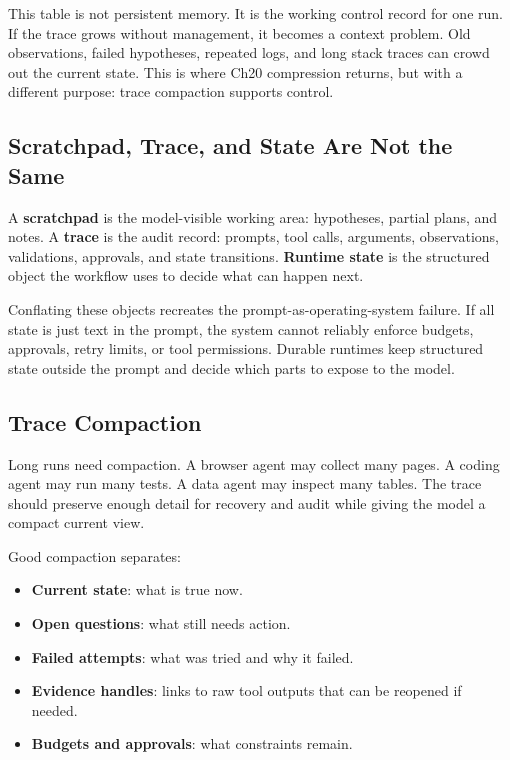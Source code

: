 This table is not persistent memory. It is the working control record for one run. If the trace grows without management, it becomes a context problem. Old observations, failed hypotheses, repeated logs, and long stack traces can crowd out the current state. This is where Ch20 compression returns, but with a different purpose: trace compaction supports control.

\subsection{Scratchpad, Trace, and State Are Not the Same}

A \textbf{scratchpad} is the model-visible working area: hypotheses, partial plans, and notes. A \textbf{trace} is the audit record: prompts, tool calls, arguments, observations, validations, approvals, and state transitions. \textbf{Runtime state} is the structured object the workflow uses to decide what can happen next.

Conflating these objects recreates the prompt-as-operating-system failure. If all state is just text in the prompt, the system cannot reliably enforce budgets, approvals, retry limits, or tool permissions. Durable runtimes keep structured state outside the prompt and decide which parts to expose to the model.

\subsection{Trace Compaction}

Long runs need compaction. A browser agent may collect many pages. A coding agent may run many tests. A data agent may inspect many tables. The trace should preserve enough detail for recovery and audit while giving the model a compact current view.

Good compaction separates:

\begin{itemize}[nosep]
  \item \textbf{Current state}: what is true now.
  \item \textbf{Open questions}: what still needs action.
  \item \textbf{Failed attempts}: what was tried and why it failed.
  \item \textbf{Evidence handles}: links to raw tool outputs that can be reopened if needed.
  \item \textbf{Budgets and approvals}: what constraints remain.
\end{itemize}


